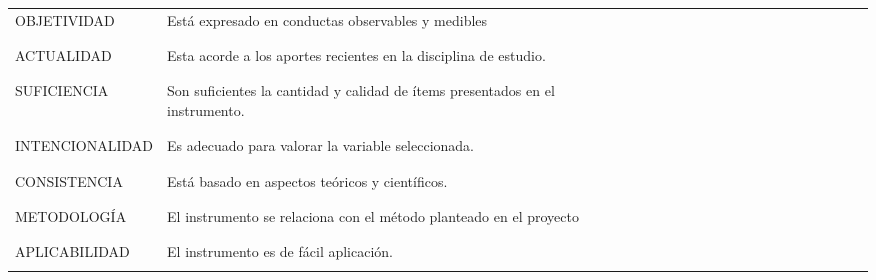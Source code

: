 \documentclass[12pt, a4paper, nofontenc, numbers=endperiod]{apa7}
\begin{document}
{\begin{turn}{90}
{\begin{tabular}{|p{3.3cm}|l|r|r|r|r|r|r|r|r|r|r|r|r|r|r|r|r|r|r|r|r|}
			&&&&&&&&&&&&&&&&&&&&&\\
			\hline
			\footnotesize OBJETIVIDAD&\multirow{-4.4}{3cm}{\singlespacing \justify \scriptsize Está expresado en conductas observables y medibles}.&&&&&&&&&&&&&&&&&&&&\\
			&&&&&&&&&&&&&&&&&&&&&\\
			&&&&&&&&&&&&&&&&&&&&&\\
			\hline
			\footnotesize ACTUALIDAD&\multirow{-4.5}{3cm}{\singlespacing \justify \scriptsize Esta acorde a los aportes recientes en la disciplina de  estudio.}&&&&&&&&&&&&&&&&&&&&\\
			&&&&&&&&&&&&&&&&&&&&&\\
			&&&&&&&&&&&&&&&&&&&&&\\
			\hline
			\footnotesize SUFICIENCIA&\multirow{-4.5}{3cm}{\singlespacing \justify \scriptsize Son suficientes la cantidad  y calidad de ítems  presentados en el  instrumento.}&&&&&&&&&&&&&&&&&&&&\\
			&&&&&&&&&&&&&&&&&&&&&\\
			&&&&&&&&&&&&&&&&&&&&&\\
			\hline
			\footnotesize INTENCIONALIDAD&\multirow{-4.5}{3cm}{\singlespacing \justify \scriptsize Es adecuado para valorar la variable seleccionada.}&&&&&&&&&&&&&&&&&&&&\\
			&&&&&&&&&&&&&&&&&&&&&\\
			&&&&&&&&&&&&&&&&&&&&&\\
			\hline
			\footnotesize CONSISTENCIA&\multirow{-4.5}{3cm}{\singlespacing \justify \scriptsize Está basado en aspectos teóricos y científicos.}&&&&&&&&&&&&&&&&&&&&\\
			&&&&&&&&&&&&&&&&&&&&&\\
			&&&&&&&&&&&&&&&&&&&&&\\
			\hline
			\footnotesize METODOLOGÍA &\multirow{-4.5}{3cm}{\singlespacing \justify \scriptsize El instrumento se relaciona con el método planteado en el proyecto}&&&&&&&&&&&&&&&&&&&&\\
			&&&&&&&&&&&&&&&&&&&&&\\
			&&&&&&&&&&&&&&&&&&&&&\\
			\hline
			\footnotesize APLICABILIDAD&\multirow{-4.5}{3cm}{\singlespacing \justify \scriptsize El instrumento es de fácil aplicación.}
			&&&&&&&&&&&&&&&&&&&&\\
			&&&&&&&&&&&&&&&&&&&&&\\
			\hline
			
		\end{tabular}
	}
\end{turn}



}
\end{document}
